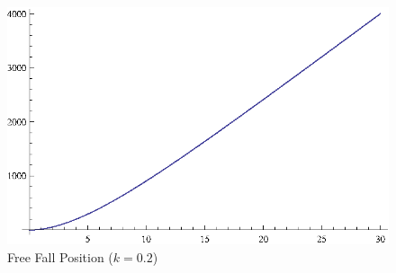\documentclass{exam}
\begin{document}
  \begin{figure}[h]
    \centering
    \includegraphics[scale=0.9]{freeFallPosition.eps}
    \caption{Free Fall Position ($k = 0.2$)}
  \end{figure}
\end{document}
